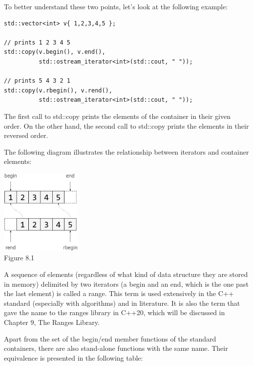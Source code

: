To better understand these two points, let’s look at the following example:

\begin{lstlisting}[style=styleCXX]
std::vector<int> v{ 1,2,3,4,5 };

// prints 1 2 3 4 5
std::copy(v.begin(), v.end(),
		  std::ostream_iterator<int>(std::cout, " "));

// prints 5 4 3 2 1
std::copy(v.rbegin(), v.rend(),
		  std::ostream_iterator<int>(std::cout, " "));
\end{lstlisting}

The first call to std::copy prints the elements of the container in their given order. On the other hand, the second call to std::copy prints the elements in their reversed order.

The following diagram illustrates the relationship between iterators and container elements:

\begin{center}
\includegraphics[width=0.3\textwidth]{content/3/chapter8/images/1.png}\\
Figure 8.1
\end{center}

A sequence of elements (regardless of what kind of data structure they are stored in memory) delimited by two iterators (a begin and an end, which is the one past the last element) is called a range. This term is used extensively in the C++ standard (especially with algorithms) and in literature. It is also the term that gave the name to the ranges library in C++20, which will be discussed in Chapter 9, The Ranges Library.

Apart from the set of the begin/end member functions of the standard containers, there are also stand-alone functions with the same name. Their equivalence is presented in the following table:


